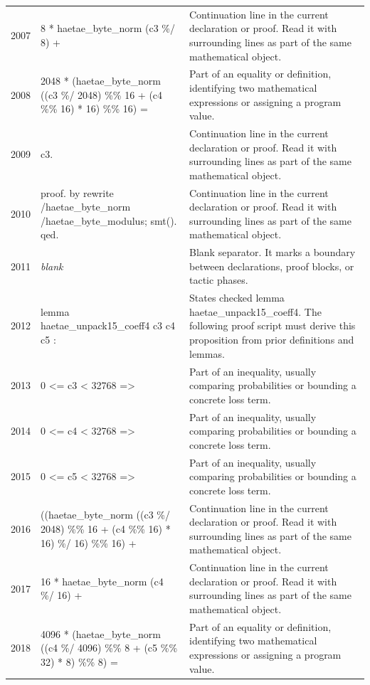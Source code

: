 \documentclass[10pt]{article}
\begin{document}
\begin{longtable}{r L{0.53\textwidth} L{0.37\textwidth}}
2007 & {\ttfamily\scriptsize     8 * haetae\_byte\_norm (c3 \%/ 8) +} & Continuation line in the current declaration or proof.  Read it with surrounding lines as part of the same mathematical object. \\
2008 & {\ttfamily\scriptsize     2048 * (haetae\_byte\_norm ((c3 \%/ 2048) \%\% 16 + (c4 \%\% 16) * 16) \%\% 16) =} & Part of an equality or definition, identifying two mathematical expressions or assigning a program value. \\
2009 & {\ttfamily\scriptsize   c3.} & Continuation line in the current declaration or proof.  Read it with surrounding lines as part of the same mathematical object. \\
2010 & {\ttfamily\scriptsize proof. by rewrite /haetae\_byte\_norm /haetae\_byte\_modulus; smt(). qed.} & Continuation line in the current declaration or proof.  Read it with surrounding lines as part of the same mathematical object. \\
2011 & {\ttfamily\scriptsize \emph{blank}} & Blank separator.  It marks a boundary between declarations, proof blocks, or tactic phases. \\
2012 & {\ttfamily\scriptsize lemma haetae\_unpack15\_coeff4 c3 c4 c5 :} & States checked lemma haetae\_unpack15\_coeff4.  The following proof script must derive this proposition from prior definitions and lemmas. \\
2013 & {\ttfamily\scriptsize   0 <= c3 < 32768 =>} & Part of an inequality, usually comparing probabilities or bounding a concrete loss term. \\
2014 & {\ttfamily\scriptsize   0 <= c4 < 32768 =>} & Part of an inequality, usually comparing probabilities or bounding a concrete loss term. \\
2015 & {\ttfamily\scriptsize   0 <= c5 < 32768 =>} & Part of an inequality, usually comparing probabilities or bounding a concrete loss term. \\
2016 & {\ttfamily\scriptsize   ((haetae\_byte\_norm ((c3 \%/ 2048) \%\% 16 + (c4 \%\% 16) * 16) \%/ 16) \%\% 16) +} & Continuation line in the current declaration or proof.  Read it with surrounding lines as part of the same mathematical object. \\
2017 & {\ttfamily\scriptsize     16 * haetae\_byte\_norm (c4 \%/ 16) +} & Continuation line in the current declaration or proof.  Read it with surrounding lines as part of the same mathematical object. \\
2018 & {\ttfamily\scriptsize     4096 * (haetae\_byte\_norm ((c4 \%/ 4096) \%\% 8 + (c5 \%\% 32) * 8) \%\% 8) =} & Part of an equality or definition, identifying two mathematical expressions or assigning a program value. \\

\end{longtable}
\end{document}

